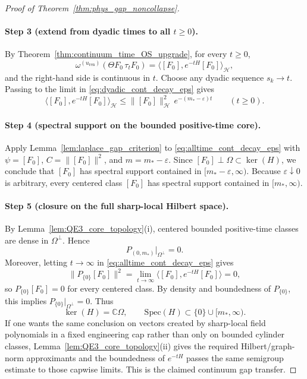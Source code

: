 \begin{proof}[Proof of Theorem~\ref{thm:phys_gap_noncollapse}]
\paragraph{Step 3 (extend from dyadic times to all $t\ge 0$).}
By Theorem~\ref{thm:continuum_time_OS_upgrade}, for every $t\ge 0$,
\[
\omega^{(u_{\mathrm{ren}})}(\Theta F_0\,\tau_t F_0)=\langle [F_0],e^{-tH}[F_0]\rangle_{\mathcal H},
\]
and the right-hand side is continuous in $t$.
Choose any dyadic sequence $s_k\to t$.
Passing to the limit in \eqref{eq:dyadic_cont_decay_eps} gives
\begin{equation}
\langle [F_0],e^{-tH}[F_0]\rangle_{\mathcal H}
\le
\|[F_0]\|_{\mathcal H}^2\,e^{-(m_*-\varepsilon)t}
\qquad (t\ge 0).
\label{eq:alltime_cont_decay_eps}
\end{equation}

\paragraph{Step 4 (spectral support on the bounded positive-time core).}
Apply Lemma~\ref{lem:laplace_gap_criterion} to \eqref{eq:alltime_cont_decay_eps} with $\psi=[F_0]$, $C=\|[F_0]\|^2$, and $m=m_*-\varepsilon$.
Since $[F_0]\perp\Omega\subset\ker(H)$, we conclude that $[F_0]$ has spectral support contained in $[m_*-\varepsilon,\infty)$.
Because $\varepsilon\downarrow 0$ is arbitrary, every centered class $[F_0]$ has spectral support contained in $[m_*,\infty)$.

\paragraph{Step 5 (closure on the full sharp-local Hilbert space).}
By Lemma~\ref{lem:QE3_core_topology}(i), centered bounded positive-time classes are dense in $\Omega^\perp$.
Hence
\[
P_{(0,m_*)}\big|_{\Omega^\perp}=0.
\]
Moreover, letting $t\to\infty$ in \eqref{eq:alltime_cont_decay_eps} gives
\[
\|P_{\{0\}}[F_0]\|^2=\lim_{t\to\infty}\langle [F_0],e^{-tH}[F_0]\rangle=0,
\]
so $P_{\{0\}}[F_0]=0$ for every centered class.
By density and boundedness of $P_{\{0\}}$, this implies $P_{\{0\}}\big|_{\Omega^\perp}=0$.
Thus
\[
\ker(H)=\mathbb C\Omega,
\qquad
\mathrm{Spec}(H)\subset\{0\}\cup[m_*,\infty).
\]
If one wants the same conclusion on vectors created by sharp-local field polynomials in a fixed engineering cap rather than only on bounded cylinder classes, Lemma~\ref{lem:QE3_core_topology}(ii) gives the required Hilbert/graph-norm approximants and the boundedness of $e^{-tH}$ passes the same semigroup estimate to those capwise limits.
This is the claimed continuum gap transfer.
\end{proof}

